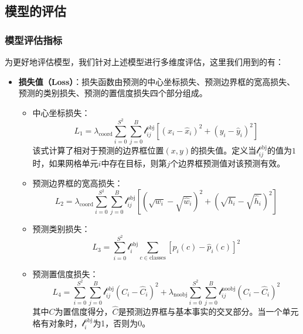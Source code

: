 \documentclass{MathorCupmodeling}
\begin{document}
	\subsection{模型的评估}\label{模型效果分析}
	\subsubsection{模型评估指标}
	为更好地评估模型，我们针对上述模型进行多维度评估，这里我们用到的有：
	\begin{itemize}
		\item \textbf{损失值（Loss）}：损失函数由预测的中心坐标损失、预测边界框的宽高损失、预测的类别损失、预测的置信度损失四个部分组成\textcolor{blue}{\cite{LOSS}}。
		\begin{itemize}
			\item {\heiti 中心坐标损失}：
		\begin{equation}
			L_1=\lambda_{\text{coord}}\sum\limits_{i=0}^{S^2}\sum\limits_{j=0}^{B}\mathcal{l}_{ij}^{\text{obj}}\left[\left(x_i-\hat{x}_i\right)^2+\left(y_i-\hat{y}_i\right)^2\right]
		\end{equation}
		该式计算了相对于预测的边界框位置$\left(x,y\right)$的损失值。定义当$\mathcal{l}_{ij}^{\text{obj}}$的值为$1$时，如果网格单元$i$中存在目标，则第$j$个边界框预测值对该预测有效。
			\item {\heiti 预测边界框的宽高损失}：
			\begin{equation}
				L_2=\lambda_{\text{coord}}\sum\limits_{i=0}^{S^2}\sum\limits_{j=0}^{B}\mathcal{l}_{ij}^{\text{obj}}\left[\left(\sqrt{w_i}-\sqrt{\hat{w}_i}\right)^2+\left(\sqrt{h_i}-\sqrt{\hat{h}_i}\right)^2\right]
			\end{equation}
			\item {\heiti 预测类别损失}：
			\begin{equation}
				L_3=\sum\limits_{i=0}^{S^2}\mathcal{l}_{i}^{\text{obj}}\sum\limits_{c\in\text{classes}}\left[p_i\left(c\right)-\hat{p}_i\left(c\right)\right]^2
			\end{equation}
			\item {\heiti 预测置信度损失}：
			\begin{equation}
				L_4=\sum\limits_{i=0}^{S^2}\sum\limits_{j=0}^{B}\mathcal{l}_{ij}^{\text{obj}}\left(C_i-\hat{C}_i\right)^2+\lambda_{\text{noobj}}\sum\limits_{i=0}^{S^2}\sum\limits_{j=0}^{B}\mathcal{l}_{ij}^{\text{noobj}}\left(C_i-\hat{C}_i\right)^2
			\end{equation}
			其中$C$为置信度得分，$\hat{C}$是预测边界框与基本事实的交叉部分。当一个单元格有对象时，$\mathcal{l}_{i}^{\text{obj}}$为1，否则为0。

\end{itemize}
\end{itemize}
\end{document}

